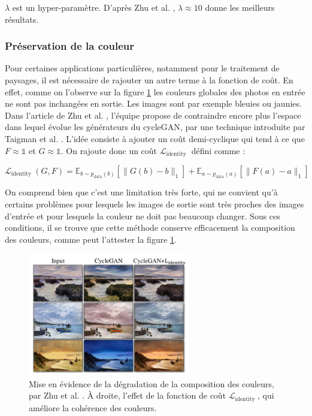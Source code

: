 $\lambda$ est un hyper-paramètre. D'après Zhu et al. \cite{zhu_unpaired_2018}, $\lambda \approx 10$ donne les meilleurs résultats.

\subsubsection{Préservation de la couleur}

Pour certaines applications particulières, notamment pour le traitement de paysages, il est nécessaire de rajouter un autre terme à la fonction de coût. En effet, comme on l'observe sur la figure \ref{Lident} les couleurs globales des photos en entrée ne sont pas inchangées en sortie. Les images sont par exemple bleuies ou  jaunies. Dans l'article de Zhu et al. \cite{zhu_unpaired_2018}, l'équipe propose de contraindre encore plus l'espace dans lequel évolue les générateurs du cycleGAN, par une technique introduite par Taigman et al. \cite{taigman_unsupervised_2016}. L'idée consiste à ajouter un coût demi-cyclique qui tend à ce que $ F \approx \mathbb{1} $ et $ G \approx \mathbb{1} $. On rajoute donc un coût $\mathcal{L}_{\text {identity }}$ défini comme :

$$\mathcal{L}_{\text {identity }}(G, F)=\mathbb{E}_{b \sim p_{\text {data}}(b)}\left[\|G(b)-b\|_{1}\right]+ \mathbb{E}_{a \sim p_{\text {data}}(a)}\left[\|F(a)-a\|_{1}\right]$$

On comprend bien que c'est une limitation très forte, qui ne convient qu'à certains problèmes pour lesquels les images de sortie sont très proches des images d'entrée et pour lesquels la couleur ne doit pas beaucoup changer. Sous ces conditions, il se trouve que cette méthode conserve efficacement la composition des couleurs, comme peut l'attester la figure \ref{Lident}. 

\begin{figure}[!h]
\centering
\includegraphics[width=200pt]{"images/Lident"}
\caption{Mise en évidence de la dégradation de la composition des couleurs, par Zhu et al. \cite{zhu_unpaired_2018}. À droite, l'effet de la fonction de coût $\mathcal{L}_{\text {identity }}$, qui améliore la cohérence des couleurs.}
\label{Lident}
\end{figure}


